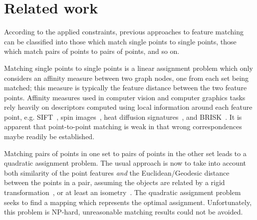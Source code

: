 \section{Related work}
\label{sec:related}

According to the applied constraints,
previous approaches to feature matching can be classified into those which match single points to single points, those which match pairs of points to pairs of points, and so on.

Matching single points to single points is a linear assignment problem which only considers an affinity measure between two graph nodes, one from each set being matched;
this measure is typically the feature distance between the two feature points.
Affinity measures used in computer vision and computer graphics tasks rely heavily on descriptors computed using local information around each feature point,
e.g. SIFT~\cite{Lowe04}, spin images~\cite{Johnson99}, heat diffusion signatures~\cite{Sun09}, and BRISK~\cite{Leutenegger11}.
It is apparent that point-to-point matching is weak in that wrong correspondences maybe readily be established.

Matching pairs of points in one set to pairs of points in the other set leads to a quadratic assignment problem.
The usual approach is now to take into account both similarity of the point features \emph{and} the Euclidean/Geodesic distance between the points in a pair,
assuming the objects are related by a rigid transformation~\cite{Leordeanu05,Cour06}, or at least an isometry~\cite{li08,Tevs09,Ovsjanikov10,Tevs11,SahilliogluY11,Windheuser11}.
The quadratic assignment problem seeks to find a mapping which represents the optimal assignment.
Unfortunately, this problem is NP-hard, unreasonable matching results could not be avoided.

